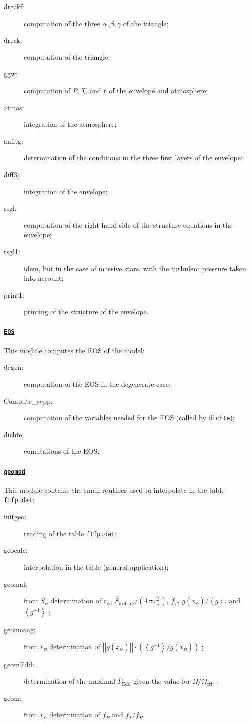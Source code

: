 \documentclass[11pt]{article}
\begin{document}
\begin{description}
 \item[dreckf:] computation of the three $\alpha,\beta,\gamma$ of the triangle;
 \item[dreck:] computation of the triangle;
 \item[ggw:] computation of $P$, $T$, and $r$ of the envelope and atmosphere;
 \item[atmos:] integration of the atmosphere;
 \item[anfitg:] determination of the conditions in the three first layers of the envelope;
 \item[diff3:] integration  of the envelope;
 \item[rsgl:] computation of the right-hand side of the structure equations in the envelope;
 \item[rsgl1:] idem, but in the case of massive stars, with the turbulent pressure taken into account;
 \item[print1:] printing of the structure of the envelope.
 \end{description}

\paragraph{\underline{\texttt{EOS}}}
This module computes the EOS of the model:

\begin{description}
 \item[degen:] computation of the EOS in the degenerate case;
 \item[Compute\_sepp:] computation of the variables needed for the EOS (called by \texttt{dichte});
 \item[dichte:] comutations of the EOS.
 \end{description}

\paragraph{\underline{\texttt{geomod}}}
This module contains the small routines used to interpolate in the table \texttt{ftfp.dat}:

\begin{description}
 \item[initgeo:] reading of the table \texttt{ftfp.dat};
 \item[geocalc:] interpolation in the table (general application);
 \item[geomat:] from $S_\psi$ determination of $r_\psi$, $S_\text{isobare}/(4\,\pi\,r_\psi^2)$, $f_T$, $g(x_\psi)/\left<g\right>$, and $\left<g^{-1}\right>$ ;
 \item[geomeang:] from $r_\psi$ determination of $\left|\left|g(x_\psi)\right|\right|\cdot\left(\left<g^{-1}\right>/g(x_\psi)\right)$ ;
 \item[geomEdd:] determination of the maximal $\Gamma_\text{Edd}$ given the value for $\Omega/\Omega_\text{crit}$ ;
 \item[geom:] from $r_\psi$ determination of $f_P$ and $f_T/f_P$
 \end{description}
\end{document}
